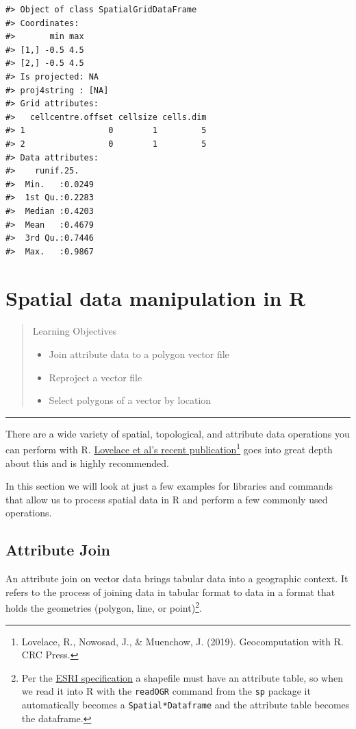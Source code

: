 \documentclass[]{book}
\providecommand{\tightlist}{%
  \setlength{\itemsep}{0pt}\setlength{\parskip}{0pt}}
\let\rmarkdownfootnote\footnote%
\def\footnote{\protect\rmarkdownfootnote}
\begin{document}
\begin{verbatim}
#> Object of class SpatialGridDataFrame
#> Coordinates:
#>       min max
#> [1,] -0.5 4.5
#> [2,] -0.5 4.5
#> Is projected: NA 
#> proj4string : [NA]
#> Grid attributes:
#>   cellcentre.offset cellsize cells.dim
#> 1                 0        1         5
#> 2                 0        1         5
#> Data attributes:
#>    runif.25.     
#>  Min.   :0.0249  
#>  1st Qu.:0.2283  
#>  Median :0.4203  
#>  Mean   :0.4679  
#>  3rd Qu.:0.7446  
#>  Max.   :0.9867
\end{verbatim}

\chapter{Spatial data manipulation in R}\label{spatialops}

\begin{quote}
Learning Objectives

\begin{itemize}
\tightlist
\item
  Join attribute data to a polygon vector file
\item
  Reproject a vector file
\item
  Select polygons of a vector by location
\end{itemize}
\end{quote}

\begin{center}\rule{0.5\linewidth}{\linethickness}\end{center}

There are a wide variety of spatial, topological, and attribute data
operations you can perform with R.
\href{https://geocompr.robinlovelace.net}{Lovelace et al's recent
publication}\footnote{Lovelace, R., Nowosad, J., \& Muenchow, J. (2019).
  Geocomputation with R. CRC Press.} goes into great depth about this
and is highly recommended.

In this section we will look at just a few examples for libraries and
commands that allow us to process spatial data in R and perform a few
commonly used operations.

\section{Attribute Join}\label{attribute-join}

An attribute join on vector data brings tabular data into a geographic
context. It refers to the process of joining data in tabular format to
data in a format that holds the geometries (polygon, line, or
point)\footnote{Per the
  \href{http://www.esri.com/library/whitepapers/pdfs/shapefile.pdf}{ESRI
  specification} a shapefile must have an attribute table, so when we
  read it into R with the \texttt{readOGR} command from the \texttt{sp}
  package it automatically becomes a \texttt{Spatial*Dataframe} and the
  attribute table becomes the dataframe.}.
\end{document}
